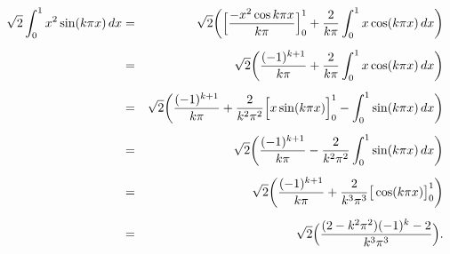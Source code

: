 \begin{solution}
\begin{enumerate}
         \begin{eqnarray*}
              \sqrt{2} \int_0^1 x^2 \sin(k\pi x)\,dx 
                         &=& \sqrt{2}\bigg(\Big[{-x^2 \cos{k\pi x} \over k\pi}\Big]_0^1
                                 + {2\over k\pi} \int_0^1 x\cos(k\pi x)\, dx\bigg) \\[0.5em]
                         &=& \sqrt{2}\bigg({(-1)^{k+1} \over k\pi}
                                 + {2\over k\pi} \int_0^1 x \cos(k\pi x)\, dx\bigg) \\[0.5em] 
                         &=& \sqrt{2}\bigg({(-1)^{k+1} \over k\pi}
                        + {2\over k^2\pi^2} \Big[x\sin(k\pi x)\Big]_0^1
                                 - \int_0^1 \sin(k\pi x)\, dx\bigg) \\[0.5em]
                         &=& \sqrt{2}\bigg({(-1)^{k+1} \over k\pi}
                        - {2\over k^2\pi^2} \int_0^1 \sin(k\pi x)\, dx\bigg) \\[0.5em]
                         &=& \sqrt{2}\bigg({(-1)^{k+1} \over k\pi}
                        + {2\over k^3\pi^3}  \big[\cos(k\pi x)\big]_0^1\bigg) \\[0.5em]
                         &=& \sqrt{2}\Big({(2-k^2\pi^2)(-1)^k - 2 \over k^3 \pi^3}\Big).
         \end{eqnarray*} 


\end{enumerate}
\end{solution}
